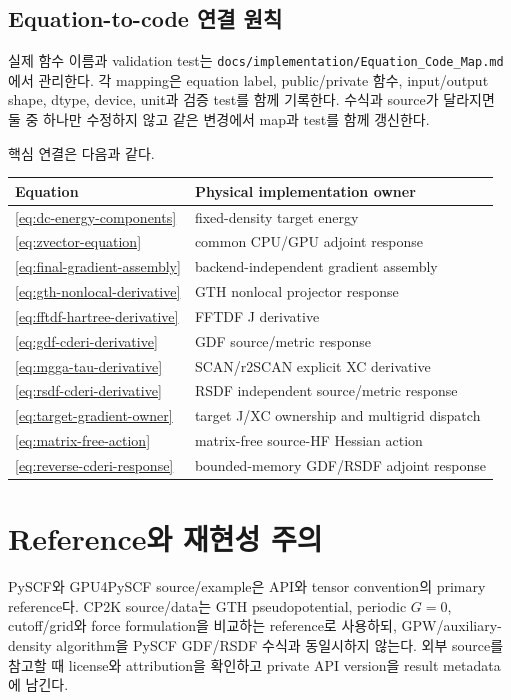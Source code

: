 \subsection{Equation-to-code 연결 원칙}

실제 함수 이름과 validation test는
\texttt{docs/implementation/Equation\_Code\_Map.md}에서 관리한다. 각 mapping은 equation label,
public/private 함수, input/output shape, dtype, device, unit과 검증 test를 함께 기록한다.
수식과 source가 달라지면 둘 중 하나만 수정하지 않고 같은 변경에서 map과 test를 함께
갱신한다.

핵심 연결은 다음과 같다.

\begin{center}
\begin{longtable}{ll}
\toprule
Equation & Physical implementation owner \\
\midrule
\eqref{eq:dc-energy-components} & fixed-density target energy \\
\eqref{eq:zvector-equation} & common CPU/GPU adjoint response \\
\eqref{eq:final-gradient-assembly} & backend-independent gradient assembly \\
\eqref{eq:gth-nonlocal-derivative} & GTH nonlocal projector response \\
\eqref{eq:fftdf-hartree-derivative} & FFTDF J derivative \\
\eqref{eq:gdf-cderi-derivative} & GDF source/metric response \\
\eqref{eq:mgga-tau-derivative} & SCAN/r2SCAN explicit XC derivative \\
\eqref{eq:rsdf-cderi-derivative} & RSDF independent source/metric response \\
\eqref{eq:target-gradient-owner} & target J/XC ownership and multigrid dispatch \\
\eqref{eq:matrix-free-action} & matrix-free source-HF Hessian action \\
\eqref{eq:reverse-cderi-response} & bounded-memory GDF/RSDF adjoint response \\
\bottomrule
\end{longtable}
\end{center}

\section{Reference와 재현성 주의}

PySCF와 GPU4PySCF source/example은 API와 tensor convention의 primary reference다. CP2K
source/data는 GTH pseudopotential, periodic $G=0$, cutoff/grid와 force formulation을
비교하는 reference로 사용하되, GPW/auxiliary-density algorithm을 PySCF GDF/RSDF 수식과
동일시하지 않는다. 외부 source를 참고할 때 license와 attribution을 확인하고 private API
version을 result metadata에 남긴다.
